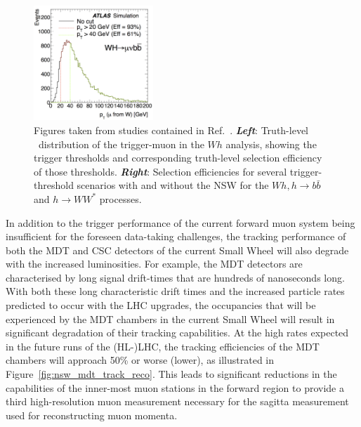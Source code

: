 \begin{figure}[!htb]
    \begin{center}
        \includegraphics[width=0.4\textwidth]{figures/nsw/nsw_ptmu_wh}
        \caption{
            Figures taken from studies contained in Ref.~\cite{NSWTDR}.
            \textit{\textbf{Left}}: Truth-level \pT~distribution of the trigger-muon in the $Wh$ analysis, showing
                the trigger thresholds and corresponding truth-level selection efficiency of those thresholds.
            \textit{\textbf{Right}}: Selection efficiencies for several trigger-threshold scenarios with and without the NSW
                for the $Wh,h\rightarrow b \bar{b}$ and $h \rightarrow WW^*$ processes.
        }
        \label{fig:nsw_wh_loss}
    \end{center}
\end{figure}

In addition to the trigger performance of the current forward muon system being insufficient
for the foreseen data-taking challenges, the tracking performance of both the MDT and CSC detectors of the current Small Wheel
will also degrade with the increased luminosities.
For example, the MDT detectors are characterised by long signal drift-times that are hundreds of nanoseconds long.
With both these long characteristic drift times and the increased particle rates predicted to occur with the LHC upgrades,
the occupancies that will be experienced by the MDT chambers in the current Small Wheel
will result in significant degradation of their tracking capabilities.
At the high rates expected in the future runs of the (HL-)LHC, the tracking efficiencies
of the MDT chambers will approach 50\% or worse (lower), as illustrated in Figure~\ref{fig:nsw_mdt_track_reco}.
This leads to significant reductions in the capabilities of the inner-most muon stations
in the forward region to provide a third high-resolution muon measurement necessary for the sagitta measurement used for reconstructing
muon momenta.

